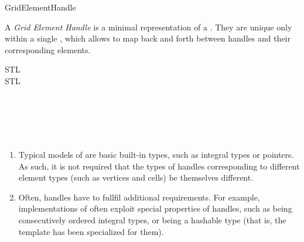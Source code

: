 \begin{Label}{GridElementHandle} 
\end{Label}

A {\em Grid Element Handle\/} is a minimal representation of  a
. 
They are unique only within a single 
, 
which allows to map back and forth between handles and their
corresponding elements.
 

STL 
\\
STL 



\W{}

\W{}

\W{}

\\
\\
\\
\\

\W{}

\begin{enumerate}
\item {}
  Typical models of  are basic built-in types, 
  such as integral types or pointers.
  As such, it is not required that the types of handles corresponding to different element types
  (such as vertices and cells) be themselves different.
\item
  Often, handles have to fullfil additional requirements. 
  For example, implementations of 
  often exploit special properties of handles, such as being consecutively ordered integral types,
  or being a hashable type (that is, the  template has been specialized
  for them).
\end{enumerate}

 ~
 ~
 ~


